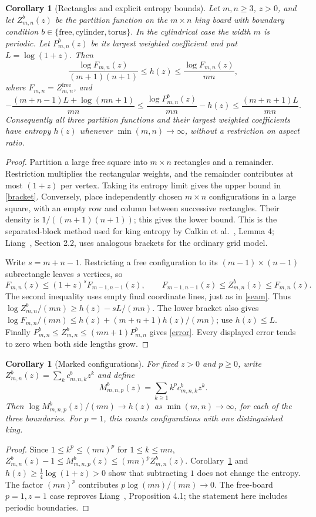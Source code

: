 \documentclass[10pt]{article}
\newtheorem{corollary}[theorem]{Corollary}
\begin{document}
\begin{corollary}[Rectangles and explicit entropy bounds]\label{rectangles}
Let $m,n\geq3$, $z>0$, and let $Z^b_{m,n}(z)$ be the partition
function on the $m\times n$ king board with boundary condition
$b\in\{\mathrm{free},\mathrm{cylinder},\mathrm{torus}\}$. In the
cylindrical case the width $m$ is periodic. Let $P^b_{m,n}(z)$ be its
largest weighted coefficient and put $L=\log(1+z)$. Then
\[
 \frac{\log F_{m,n}(z)}{(m+1)(n+1)}\leq h(z)
 \leq\frac{\log F_{m,n}(z)}{mn},
 \tag{5}\label{bracket}
\]
where $F_{m,n}=Z^{\mathrm{free}}_{m,n}$, and
\[
 -\frac{(m+n-1)L+\log(mn+1)}{mn}
 \leq \frac{\log P^b_{m,n}(z)}{mn}-h(z)
 \leq\frac{(m+n+1)L}{mn}.
 \tag{6}\label{error}
\]
Consequently all three partition functions and their largest weighted
coefficients have entropy $h(z)$ whenever $\min(m,n)\to\infty$,
without a restriction on aspect ratio.
\end{corollary}
\begin{proof}
Partition a large free square into $m\times n$ rectangles and a
remainder. Restriction multiplies the rectangular weights, and the
remainder contributes at most $(1+z)$ per vertex. Taking its entropy
limit gives the upper bound in \eqref{bracket}. Conversely, place
independently chosen $m\times n$ configurations in a large square,
with an empty row and column between successive rectangles. Their
density is $1/((m+1)(n+1))$; this gives the lower bound. This is the
separated-block method used for king entropy by Calkin et al.~\cite{kings},
Lemma 4; Liang~\cite{liang2}, Section 2.2, uses analogous brackets
for the ordinary grid model.

Write $s=m+n-1$. Restricting a free configuration to its
$(m-1)\times(n-1)$ subrectangle leaves $s$ vertices, so
\[
 F_{m,n}(z)\leq(1+z)^sF_{m-1,n-1}(z),\qquad
 F_{m-1,n-1}(z)\leq Z^b_{m,n}(z)\leq F_{m,n}(z).
\]
The second inequality uses empty final coordinate lines, just as
in \eqref{seam}. Thus $\log Z^b_{m,n}/(mn)\geq h(z)-sL/(mn)$.
The lower bracket also gives
$\log F_{m,n}/(mn)\leq h(z)+(m+n+1)h(z)/(mn)$;
use $h(z)\leq L$. Finally
$P^b_{m,n}\leq Z^b_{m,n}\leq(mn+1)P^b_{m,n}$ gives \eqref{error}.
Every displayed error tends to zero when both side lengths grow.
\end{proof}

\begin{corollary}[Marked configurations]\label{marked}
For fixed $z>0$ and $p\geq0$, write
$Z^b_{m,n}(z)=\sum_k c^b_{m,n,k}z^k$ and define
\[
 M^b_{m,n,p}(z)=\sum_{k\geq1}k^p c^b_{m,n,k}z^k.
\]
Then $\log M^b_{m,n,p}(z)/(mn)\to h(z)$ as
$\min(m,n)\to\infty$, for each of the three boundaries.
For $p=1$, this counts configurations with one distinguished king.
\end{corollary}
\begin{proof}
Since $1\leq k^p\leq(mn)^p$ for $1\leq k\leq mn$,
$Z^b_{m,n}(z)-1\leq M^b_{m,n,p}(z)\leq(mn)^p Z^b_{m,n}(z)$.
Corollary~\ref{rectangles} and $h(z)\geq\frac14\log(1+z)>0$
show that subtracting $1$ does not change the entropy. The factor
$(mn)^p$ contributes $p\log(mn)/(mn)\to0$.
The free-board $p=1,z=1$ case reproves Liang~\cite{liang},
Proposition 4.1; the statement here includes periodic boundaries.
\end{proof}
\end{document}
